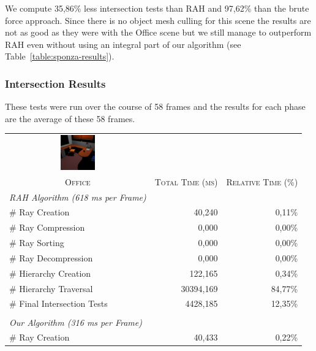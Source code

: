 \documentclass{egpubl}
\begin{document}
We compute 35,86\% less intersection tests than RAH and 97,62\% than the brute force approach. Since there is no object mesh culling for this scene the results are not as good as they were with the Office scene but we still manage to outperform RAH even without using an integral part of our algorithm (see Table~\ref{table:sponza-results}).

\subsubsection{Intersection Results}

These tests were run over the course of 58 frames and the results for each phase are the average of these 58 frames. 

\begin{table}[!htb]
\begin{center}
\fontsize{7}{9}
\selectfont
\begin{tabular}{l|rr}
    \multicolumn{1}{c}{\includegraphics[width=1.5cm]{Images/Office_Preview}} & & \\
    \multicolumn{1}{c|}{\textsc{Office}} & \textsc{Total Time (ms)} & \textsc{Relative Time (\%)}\\
    \hline
    \emph{RAH Algorithm (618 ms per Frame)} & & \\
    \hline
    \quad \# Ray Creation               & 40,240	& 0,11\%	\\
    \quad \# Ray Compression            & 0,000     & 0,00\%	\\
    \quad \# Ray Sorting                & 0,000	    & 0,00\%    \\
    \quad \# Ray Decompression          & 0,000	    & 0,00\%    \\
    \quad \# Hierarchy Creation         & 122,165	& 0,34\%    \\
    \quad \# Hierarchy Traversal        & 30394,169	& 84,77\%   \\
    \quad \# Final Intersection Tests   & 4428,185	& 12,35\%	\\
    & & \\
    \hline
    \emph{Our Algorithm (316 ms per Frame)} & & \\
    \hline
    \quad \# Ray Creation               & 40,433	& 0,22\%	\\

\end{tabular}
\end{center}
\end{table}
\end{document}
